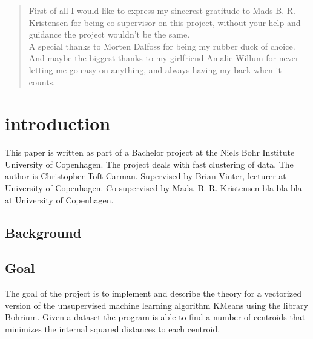\documentclass[12pt]{report}
\begin{document}



\begin{abstract}

\end{abstract}


\newpage

\renewcommand{\abstractname}{Acknowledgements}
\begin{abstract}
  First of all I would like to express my sincerest gratitude to Mads B. R. Kristensen for being co-supervisor on this project, without your help and guidance the project wouldn't be the same. \\
  A special thanks to Morten Dalfoss for being my rubber duck of choice. \\
  And maybe the biggest thanks to my girlfriend Amalie Willum for never letting me go easy on anything, and always having my back when it counts.
\end{abstract}


\newpage

\tableofcontents

\newpage
\chapter{introduction}
\label{sec:intro}
This paper is written as part of a Bachelor project at the Niels Bohr Institute University of Copenhagen. The project deals with fast clustering of data. The author is Christopher Toft Carman. Supervised by Brian Vinter, lecturer at University of Copenhagen. Co-supervised by Mads. B. R. Kristensen bla bla bla at University of Copenhagen.
\section{Background}
\label{subsec:background}

\section{Goal}
\label{subsec:goal}
The goal of the project is to implement and describe the theory for a vectorized version of the unsupervised machine learning algorithm KMeans using the library Bohrium. Given a dataset the program is able to find a number of centroids that minimizes the internal squared distances to each centroid.
\end{document}
